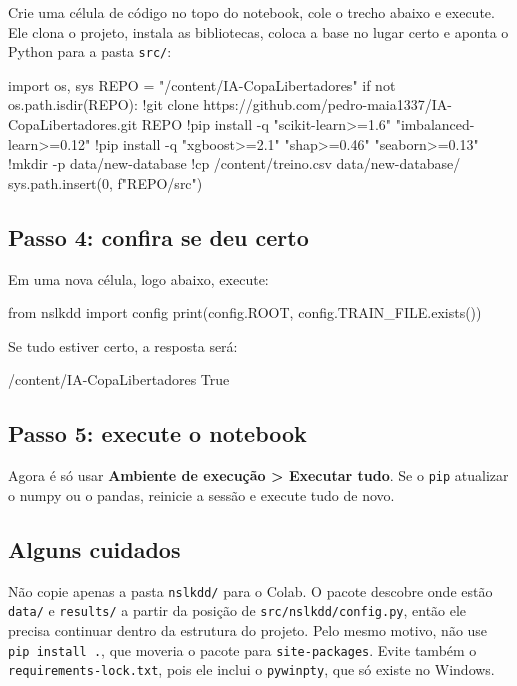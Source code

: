 \documentclass[11pt,a4paper]{article}
\begin{document}
Crie uma célula de código no topo do notebook, cole o trecho abaixo e execute. Ele clona o projeto, instala as bibliotecas, coloca a base no lugar certo e aponta o Python para a pasta \texttt{src/}:

\begin{codigo}
import os, sys
REPO = "/content/IA-CopaLibertadores"
if not os.path.isdir(REPO):
    !git clone https://github.com/pedro-maia1337/IA-CopaLibertadores.git {REPO}
!pip install -q "scikit-learn>=1.6" "imbalanced-learn>=0.12"
!pip install -q "xgboost>=2.1" "shap>=0.46" "seaborn>=0.13"
!mkdir -p data/new-database
!cp /content/treino.csv data/new-database/
sys.path.insert(0, f"{REPO}/src")
\end{codigo}

\subsection*{Passo 4: confira se deu certo}

Em uma nova célula, logo abaixo, execute:

\begin{codigo}
from nslkdd import config
print(config.ROOT, config.TRAIN_FILE.exists())
\end{codigo}

Se tudo estiver certo, a resposta será:

\begin{saida}
/content/IA-CopaLibertadores True
\end{saida}

\subsection*{Passo 5: execute o notebook}

Agora é só usar \textbf{Ambiente de execução > Executar tudo}. Se o \texttt{pip} atualizar o numpy ou o pandas, reinicie a sessão e execute tudo de novo.

\subsection*{Alguns cuidados}

Não copie apenas a pasta \texttt{nslkdd/} para o Colab. O pacote descobre onde estão \texttt{data/} e \texttt{results/} a partir da posição de \texttt{src/nslkdd/config.py}, então ele precisa continuar dentro da estrutura do projeto. Pelo mesmo motivo, não use \texttt{pip install .}, que moveria o pacote para \texttt{site-packages}. Evite também o \texttt{requirements-lock.txt}, pois ele inclui o \texttt{pywinpty}, que só existe no Windows.
\end{document}
